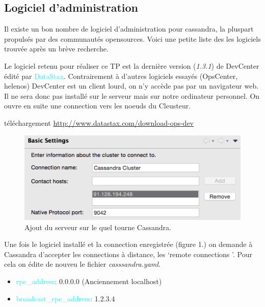 \subsection{Logiciel d'administration}
\par Il existe un bon nombre de logiciel d'administration pour cassandra, la pluspart propulsés par des communautés opensources.
Voici une petite liste des les logiciels trouvée après un brève recherche.
\par Le logiciel retenu pour réaliser ce TP est la dernière version (\textit{1.3.1}) de DevCenter édité par \textcolor{cyan}{DataStax}.
Contrairement à d'autres logiciels essayés (OpsCenter, helenos) DevCenter est un client lourd, on n'y accède pas par
un navigateur web. Il ne sera donc pas installé sur le serveur mais sur notre ordinateur personnel. On ouvre en suite
une connection vers les noeuds du Cleusteur.
\begin{block}{téléchargement}
\href{http://www.datastax.com/download-ops-dev}{http://www.datastax.com/download-ops-dev}
\end{block}

\begin{figure}[h!]
\centering
\includegraphics[scale=0.5]{img/ip.png}
\caption{Ajout du serveur sur le quel tourne Cassandra.}
\end{figure}

\par Une fois le logiciel installé et la connection enregistrée (figure 1.) on demande à Cassandra d'accepter les connections à 
distance, les \lq remote connections \rq. Pour cela on édite de nouveu le fichier \textit{casssandra.yaml}.
\begin{itemize}
\item \textcolor{cyan}{rpc\_address}\textcolor{magenta}{:} 0.0.0.0 (Anciennement localhost)
\item \textcolor{cyan}{broadcast\_rpc\_address}\textcolor{magenta}{:} 1.2.3.4
\end{itemize}

